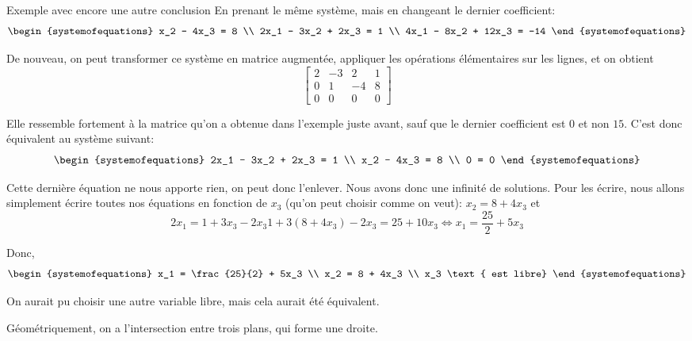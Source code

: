 \documentclass{article}
\begin{document}
\begin{parag}{Exemple avec encore une autre conclusion}
    En prenant le même système, mais en changeant le dernier coefficient:
   \[\begin{systemofequations}
   x_2 - 4x_3 = 8 \\
   2x_1 - 3x_2 + 2x_3 = 1 \\
   4x_1 - 8x_2 + 12x_3 = -14
   \end{systemofequations}\]

   De nouveau, on peut transformer ce système en matrice augmentée, appliquer les opérations élémentaires sur les lignes, et on obtient
   \[\begin{bmatrix} 2 & -3 & 2 & 1 \\ 0 & 1 & -4 & 8 \\ 0 & 0 & 0 & 0 \end{bmatrix} \]

   Elle ressemble fortement à la matrice qu'on a obtenue dans l'exemple juste avant, sauf que le dernier coefficient est $0$ et non $15$. C'est donc équivalent au système suivant:
    \[\begin{systemofequations}
    2x_1 - 3x_2 + 2x_3 = 1 \\
    x_2 - 4x_3 = 8 \\
    0 = 0
    \end{systemofequations}\]

    Cette dernière équation ne nous apporte rien, on peut donc l'enlever. Nous avons donc une infinité de solutions. Pour les écrire, nous allons simplement écrire toutes nos équations en fonction de $x_3$ (qu'on peut choisir comme on veut): $x_2 = 8 + 4x_3$ et
    \[2x_1 = 1 + 3x_3 - 2x_3 1 + 3\left(8 + 4x_3\right) - 2x_3 = 25 + 10x_3 \iff x_1 = \frac{25}{2} + 5x_3\]

    Donc,
    \[\begin{systemofequations}
    x_1 = \frac{25}{2} + 5x_3 \\
    x_2 = 8 + 4x_3 \\
    x_3 \text{ est libre}
    \end{systemofequations}\]

    On aurait pu choisir une autre variable libre, mais cela aurait été équivalent.

    Géométriquement, on a l'intersection entre trois plans, qui forme une droite.
\end{parag}
\end{document}
